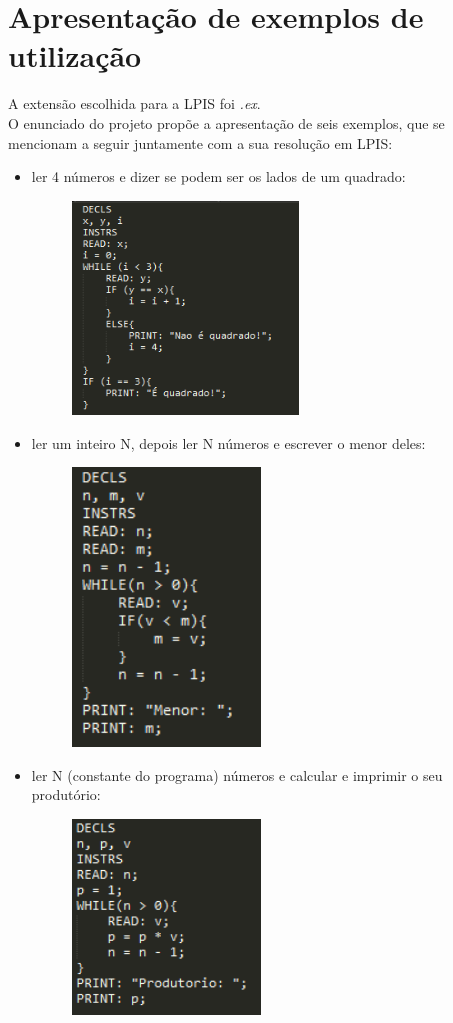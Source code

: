 \documentclass{report}
\begin{document}
\chapter{Apresentação de exemplos de utilização}
A extensão escolhida para a LPIS foi \textit{.ex}.\\
O enunciado do projeto propõe a apresentação de seis exemplos, que se mencionam a seguir juntamente com a sua resolução em LPIS:
\begin{itemize}
	\item ler 4 números e dizer se podem ser os lados de um quadrado:
	\begin{figure}[h]
	\centering
	\includegraphics[width=60mm, scale=0.5]{ex1.PNG}
	\end{figure}
	\newpage
	\item ler um inteiro N, depois ler N números e escrever o menor deles:
	\begin{figure}[h]
	\centering
	\includegraphics[width=50mm, scale=0.5]{ex2.PNG}
	\end{figure}
	\item ler N (constante do programa) números e calcular e imprimir o seu produtório:
	\begin{figure}[h]
	\centering
	\includegraphics[width=50mm, scale=0.5]{ex3.PNG}

\end{figure}
\end{itemize}
\end{document}
